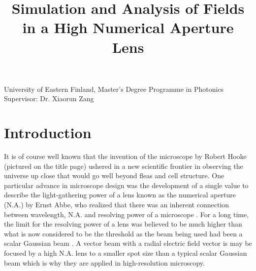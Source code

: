 \documentclass[12pt,a4paper]{article}
\begin{document}
%
\begin{frontmatter}
%
%
\title{Simulation and Analysis of Fields in a High Numerical Aperture Lens} %
%
%
%
%
University of Eastern Finland, Master's Degree Programme in Photonics\\[1mm]
%
%
Supervisor: Dr. Xiaorun Zang
%
%
%
\end{frontmatter}
\thispagestyle{empty}
\tableofcontents
\clearpage
%
\pagestyle{plain}
\setcounter{page}{1}
%
\section{Introduction}
%
It is of course well known that the invention of the microscope by Robert Hooke (pictured on the title page) ushered in a new scientific frontier in observing the universe up close that would go well beyond fleas and cell structure. One particular advance in microscope design was the development of a single value to describe the light-gathering power of a lens known as the numerical aperture (N.A.) by Ernst Abbe, who realized that there was an inherent connection between wavelength, N.A. and resolving power of a microscope \cite{Hecht}. For a long time, the limit for the resolving power of a lens was believed to be much higher than what is now considered to be the threshold as the beam being used had been a scalar Gaussian beam \cite{Novotny}. A vector beam with a radial electric field vector is may be focused by a high N.A. lens to a smaller spot size than a typical scalar Gaussian beam which is why they are applied in high-resolution microscopy\cite{Saleh}. 
\end{document}
